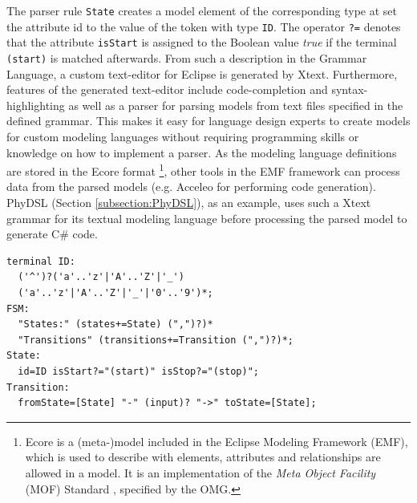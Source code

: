 \documentclass[runningheads,a4paper]{llncs}
\begin{document}
    The parser rule \texttt{State} creates a model element of the corresponding type at set the attribute id  to the value of the token with type \texttt{ID}. 
    The operator \texttt{?=} denotes that the attribute \texttt{isStart} is assigned to the Boolean value \textit{true} if the terminal \texttt{(start)} is matched afterwards. 
    From such a description in the Grammar Language, a custom text-editor for Eclipse is generated by Xtext. Furthermore, features of the generated text-editor include code-completion and syntax-highlighting
    as well as a parser for parsing models from text files specified in the defined grammar. This makes it easy for language design experts 
    to create models for custom modeling languages without requiring programming skills or knowledge on how to implement a parser.
    As the modeling language definitions are stored in the Ecore format \footnote{Ecore is a (meta-)model included in the Eclipse Modeling Framework (EMF), which is used to describe with elements, attributes and relationships are allowed 
    in a model. It is an implementation of the \emph{Meta Object Facility} (MOF) Standard \cite{mof20062}, specified by the OMG.}, other tools in the EMF framework can process data from the parsed 
    models (e.g. Acceleo\cite{musset2006acceleo} for performing code generation). PhyDSL (Section \ref{subsection:PhyDSL}), as an example, uses such a Xtext grammar for its textual modeling language before 
    processing the parsed model to generate C\# code.
\begin{lstlisting}[captionpos=b, label=lst:fsmgrammar]
terminal ID: 
  ('^')?('a'..'z'|'A'..'Z'|'_') 
  ('a'..'z'|'A'..'Z'|'_'|'0'..'9')*; 
FSM: 
  "States:" (states+=State) (",")?)* 
  "Transitions" (transitions+=Transition (",")?)*;
State: 
  id=ID isStart?="(start)" isStop?="(stop)";
Transition: 
  fromState=[State] "-" (input)? "->" toState=[State];
\end{lstlisting}
%    
\end{document}
